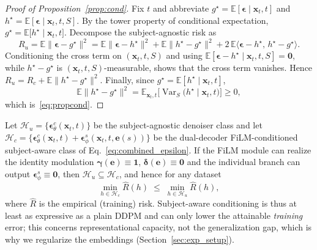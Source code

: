 \begin{proof}[Proof of Proposition~\ref{prop:cond}]
Fix $t$ and abbreviate $g^\star=\mathbb{E}[\boldsymbol{\epsilon}\mid\mathbf{x}_t,t]$
and $h^\star=\mathbb{E}[\boldsymbol{\epsilon}\mid\mathbf{x}_t,t,S]$. By the tower
property of conditional expectation,
$g^\star=\mathbb{E}\!\big[h^\star\mid\mathbf{x}_t,t\big]$. Decompose the
subject-agnostic risk as
\[
R_u=\mathbb{E}\big\|\boldsymbol{\epsilon}-g^\star\big\|^2
=\mathbb{E}\big\|\boldsymbol{\epsilon}-h^\star\big\|^2
+\mathbb{E}\big\|h^\star-g^\star\big\|^2
+2\,\mathbb{E}\big\langle\boldsymbol{\epsilon}-h^\star,\,h^\star-g^\star\big\rangle .
\]
Conditioning the cross term on $(\mathbf{x}_t,t,S)$ and using
$\mathbb{E}[\boldsymbol{\epsilon}-h^\star\mid\mathbf{x}_t,t,S]=\mathbf{0}$, while
$h^\star-g^\star$ is $(\mathbf{x}_t,t,S)$-measurable, shows that the cross term
vanishes. Hence $R_u=R_c+\mathbb{E}\|h^\star-g^\star\|^2$. Finally, since
$g^\star=\mathbb{E}[h^\star\mid\mathbf{x}_t,t]$,
\[
\mathbb{E}\big\|h^\star-g^\star\big\|^2
=\mathbb{E}_{\mathbf{x}_t,t}\!\big[\operatorname{Var}_S\!\big(h^\star\mid\mathbf{x}_t,t\big)\big]\ge 0,
\]
which is~\eqref{eq:propcond}.
\end{proof}

\begin{proposition}
\label{prop:contain}
Let $\mathcal{H}_u=\{\boldsymbol{\epsilon}^{c}_{\theta}(\mathbf{x}_t,t)\}$ be the
subject-agnostic denoiser class and let
$\mathcal{H}_c=\{\boldsymbol{\epsilon}^{c}_{\theta}(\mathbf{x}_t,t)+
\boldsymbol{\epsilon}^{s}_{\phi}(\mathbf{x}_t,t,\mathbf{e}(s))\}$ be the
dual-decoder FiLM-conditioned subject-aware class of Eq.~\eqref{eq:combined_epsilon}.
If the FiLM module can realize the identity modulation
$\boldsymbol{\gamma}(\mathbf{e})\equiv\mathbf{1}$,
$\boldsymbol{\delta}(\mathbf{e})\equiv\mathbf{0}$ and the individual branch can
output $\boldsymbol{\epsilon}^{s}_{\phi}\equiv\mathbf{0}$, then
$\mathcal{H}_u\subseteq\mathcal{H}_c$, and hence for any dataset
\begin{equation}
  \min_{h\in\mathcal{H}_c}\widehat{R}(h)\;\le\;\min_{h\in\mathcal{H}_u}\widehat{R}(h),
  \label{eq:contain}
\end{equation}
where $\widehat{R}$ is the empirical (training) risk. Subject-aware conditioning is
thus at least as expressive as a plain DDPM and can only lower the attainable
\emph{training} error; this concerns representational capacity, not the
generalization gap, which is why we regularize the embeddings
(Section~\ref{sec:exp_setup}).
\end{proposition}

